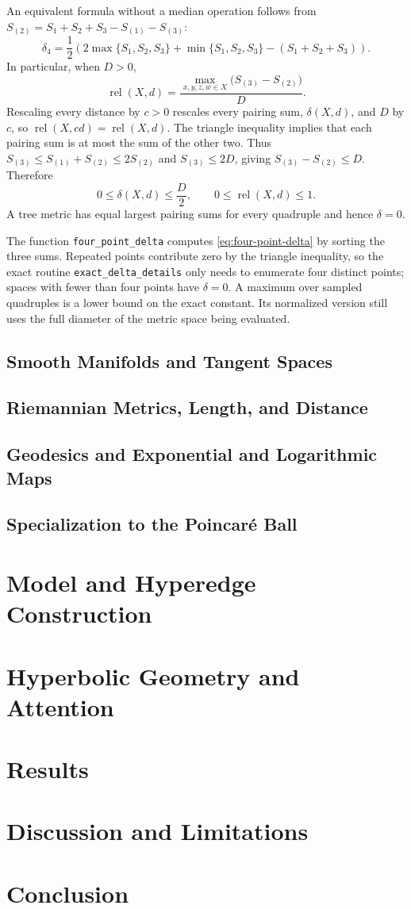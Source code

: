 \documentclass{article}
\theoremstyle{definition}
\theoremstyle{plain}
\begin{document}
An equivalent formula without a median operation follows from
$S_{(2)}=S_1+S_2+S_3-S_{(1)}-S_{(3)}$:
\[
  \delta_4=\frac{1}{2}\left(
    2\max\{S_1,S_2,S_3\}+\min\{S_1,S_2,S_3\}
    -(S_1+S_2+S_3)\right).
\]
In particular, when $D>0$,
\[
  \boxed{\operatorname{rel}(X,d)
    =\frac{\max_{x,y,z,w\in X}\bigl(S_{(3)}-S_{(2)}\bigr)}{D}.}
\]
Rescaling every distance by $c>0$ rescales every pairing sum,
$\delta(X,d)$, and $D$ by $c$, so $\operatorname{rel}(X,cd)
=\operatorname{rel}(X,d)$. The triangle inequality implies that each
pairing sum is at most the sum of the other two. Thus
$S_{(3)}\leq S_{(1)}+S_{(2)}\leq2S_{(2)}$ and $S_{(3)}\leq2D$,
giving $S_{(3)}-S_{(2)}\leq D$. Therefore
\[
  0\leq\delta(X,d)\leq\frac{D}{2},\qquad
  0\leq\operatorname{rel}(X,d)\leq1.
\]
A tree metric has equal largest pairing sums for every quadruple and
hence $\delta=0$.

The function \texttt{four\_point\_delta} computes
\eqref{eq:four-point-delta} by sorting the three sums.
Repeated points contribute zero by the triangle inequality, so the
exact routine \texttt{exact\_delta\_details} only needs to enumerate
four distinct points; spaces with fewer than four points have
$\delta=0$. A maximum over sampled quadruples is a lower bound on the
exact constant. Its normalized version still uses the full diameter
of the metric space being evaluated.

\subsection{Smooth Manifolds and Tangent Spaces}

\subsection{Riemannian Metrics, Length, and Distance}

\subsection{Geodesics and Exponential and Logarithmic Maps}

\subsection{Specialization to the Poincar\'e Ball}

\section{Model and Hyperedge Construction}

\section{Hyperbolic Geometry and Attention}

\section{Results}

\section{Discussion and Limitations}

\section{Conclusion}
\end{document}
